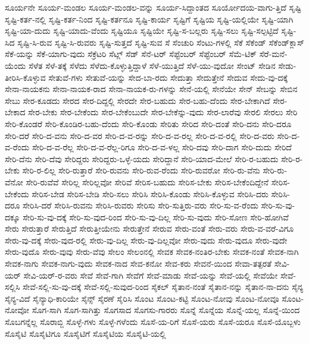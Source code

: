 {ಸೂರ್ಯನೇ
ಸೂರ್ಯ-ಮಂಡಲ
ಸೂರ್ಯ-ಮಂಡಲ-ವನ್ನು
ಸೂರ್ಯ-ಸಿದ್ದಾಂತದ
ಸೂರ್ಯೋದಯ-ವಾಗು-ತ್ತಿದೆ
ಸೃಷ್ಟಿ
ಸೃಷ್ಟಿ-ಕರ್ತ-ನಲ್ಲಿ
ಸೃಷ್ಟಿ-ಕರ್ತ-ನಿಂದ
ಸೃಷ್ಟಿ-ಕರ್ತನೂ
ಸೃಷ್ಟಿ-ಕಾರ್ಯ
ಸೃಷ್ಟಿಗೆ
ಸೃಷ್ಟಿಯ
ಸೃಷ್ಟಿ-ಯಲ್ಲಿಯೇ
ಸೃಷ್ಟಿ-ಯಾಗಿ
ಸೃಷ್ಟಿ-ಯಾ-ದುದು
ಸೃಷ್ಟಿ-ಯಾದು-ವೆಂದು
ಸೃಷ್ಟಿಯೂ
ಸೃಷ್ಟಿಯೇ
ಸೃಷ್ಟಿ-ಸ-ಬಲ್ಲರು
ಸೃಷ್ಟಿ-ಸಲು
ಸೃಷ್ಟಿ-ಸಲ್ಪಟ್ಟಿದೆ
ಸೃಷ್ಟಿ-ಸಿದ
ಸೃಷ್ಟಿ-ಸಿ-ರುವ
ಸೃಷ್ಟಿ-ಸಿ-ರುವರು
ಸೃಷ್ಟಿ-ಸುತ್ತದೆ
ಸೃಷ್ಟಿ-ಸುವ
ಸೆ
ಸೆಂಚುರಿ
ಸೆಂಟು-ಗಳಲ್ಲಿ
ಸೆಕೆ
ಸೆಕೆಂಡ್
ಸೆಕೆಂಡ್‌ಕ್ಲಾಸ್
ಸೆಕೆ-ಯನ್ನು
ಸೆಕೆ-ಯಾಗು-ವುದು
ಸೆಕ್ರೆಟರಿ
ಸೆಟ್ಲ್
ಸೆಡ್
ಸೆನೆ-ಟರ್
ಸೆಪ್ಟೆಂಬರ್
ಸೆಪ್ಟೆಂಬರ್‌
ಸೆಮೆ-ಟಿಕ್
ಸೆರೆ-ಮನೆ-ಯೆಂದು
ಸೆಳೆತ
ಸೆಳೆ-ತಕ್ಕೆ
ಸೆಳೆದು
ಸೆಳೆದು-ಕೊಳ್ಳುತ್ತಿದ್ದಾಳೆ
ಸೆಳೆ-ಯುತ್ತಿದೆ
ಸೆಳೆ-ಯು-ವುದೋ
ಸೇಂಟ್
ಸೇಡಿನ
ಸೇಡು-ತೀರಿಸಿ-ಕೊಳ್ಳುವ
ಸೇತುವೆ-ಗಳು
ಸೇತುವೆ-ಯನ್ನು
ಸೇದ-ಬಾ-ರದು
ಸೇದುತ್ತಾ
ಸೇದುತ್ತೇನೆ
ಸೇದುವ
ಸೇದು-ವು-ದಕ್ಕೆ
ಸೇನಾ-ನಾಯಕನು
ಸೇನಾ-ನಾಯಕ-ರಾದ
ಸೇನಾ-ನಾಯಕ-ರು-ಗಳನ್ನು
ಸೇನೆ-ಯಲ್ಲಿ
ಸೇನೆಯೇ
ಸೇನ್
ಸೇಬನ್ನು
ಸೇಬಿನ
ಸೇಬು
ಸೇರ-ಕೂಡದು
ಸೇರದ
ಸೇರ-ದಿದ್ದಲ್ಲಿ
ಸೇರದೇ
ಸೇರ-ಬಹುದು
ಸೇರ-ಬಹು-ದೆಂದು
ಸೇರ-ಬೇಕಾಗಿದೆ
ಸೇರ-ಬೇಕಾದ
ಸೇರ-ಬೇಕು
ಸೇರ-ಬೇಕೆಂದು
ಸೇರ-ಬೇಕೆಂಬುದೇ
ಸೇರ-ಬೇಕೆನ್ನು-ವುದು
ಸೇರ-ಲಾರೆವು
ಸೇರಲಿ
ಸೇರಲು
ಸೇರಿ
ಸೇರಿ-ಕೊಂಡರೆ
ಸೇರಿ-ಕೊಂಡಿರ-ಬಹು-ದೆಂದು
ಸೇರಿ-ಕೊಂಡು
ಸೇರಿತು
ಸೇರಿದ
ಸೇರಿ-ದಂತೆ
ಸೇರಿ-ದನು
ಸೇರಿ-ದರೂ
ಸೇರಿ-ದರೆ
ಸೇರಿ-ದ-ವನು
ಸೇರಿ-ದ-ವರ
ಸೇರಿ-ದ-ವ-ರನ್ನು
ಸೇರಿ-ದ-ವ-ರಲ್ಲ
ಸೇರಿ-ದ-ವ-ರಲ್ಲಿ
ಸೇರಿ-ದ-ವರು
ಸೇರಿ-ದ-ವ-ರೆಂದು
ಸೇರಿ-ದ-ವ-ರೆಲ್ಲ
ಸೇರಿ-ದ-ವ-ರೆಲ್ಲ-ರಿಗೂ
ಸೇರಿ-ದ-ವ-ಳಲ್ಲ
ಸೇರಿ-ದವು
ಸೇರಿ-ದಾಗ
ಸೇರಿ-ದುದು
ಸೇರಿದೆ
ಸೇರಿ-ದೆನು
ಸೇರಿ-ದೆವು
ಸೇರಿದ್ದರು
ಸೇರಿದ್ದರು-ಒಳ್ಳೆ-ಯದು
ಸೇರಿದ್ದಾನೆ
ಸೇರಿ-ಯಾದ-ಮೇಲೆ
ಸೇರಿ-ರ-ಬಹುದು
ಸೇರಿ-ರ-ಬೇಕು
ಸೇರಿ-ರ-ಲಿಲ್ಲ
ಸೇರಿ-ರುತ್ತಾರೆ
ಸೇರಿ-ರುವನು
ಸೇರಿ-ರುವ-ರೆಂದು
ಸೇರಿ-ರುವರೋ
ಸೇರಿ-ರು-ವೆನು
ಸೇರಿ-ರು-ವೆನೋ
ಸೇರಿ-ರುವೆವೆ
ಸೇರಿಲ್ಲ
ಸೇರಿಲ್ಲವೋ
ಸೇರಿವೆ
ಸೇರಿಸ-ಬಹುದು
ಸೇರಿಸ-ಬೇಕು
ಸೇರಿಸ-ಬೇಕೆಂದಿದ್ದೇನೆ
ಸೇರಿಸ-ಬೇಕೆಂದು
ಸೇರಿಸ-ಬೇಡ
ಸೇರಿಸ-ಬೇಡಿ
ಸೇರಿ-ಸಲು
ಸೇರಿಸಿ
ಸೇರಿಸಿ-ಕೊಂಡು
ಸೇರಿಸಿ-ಕೊಳ್ಳುವ
ಸೇರಿಸಿ-ದರು
ಸೇರಿಸಿ-ದರೂ
ಸೇರಿಸಿ-ದರೆ
ಸೇರಿಸಿ-ರುವನು
ಸೇರಿಸಿ-ರುವರು
ಸೇರಿಸು
ಸೇರಿ-ಸುತ್ತಿರು-ವರು
ಸೇರಿ-ಸು-ವ-ರೆಂದು
ಸೇರಿ-ಸು-ವು-ದಕ್ಕೂ
ಸೇರಿ-ಸು-ವು-ದಕ್ಕೆ
ಸೇರಿ-ಸು-ವುದ-ರಿಂದ
ಸೇರಿ-ಸು-ವು-ದಿಲ್ಲ
ಸೇರಿ-ಸು-ವುದು
ಸೇರಿ-ಸೋಣ
ಸೇರಿ-ಹೋಗಿವೆ
ಸೇರು
ಸೇರುತ್ತಾರೆ
ಸೇರುತ್ತಿದೆ
ಸೇರುತ್ತೀಯೇನು
ಸೇರುತ್ತೇನೆ
ಸೇರುವ
ಸೇರು-ವಂತೆ
ಸೇರು-ವರು
ಸೇರು-ವ-ವರೆ-ವಿಗೂ
ಸೇರು-ವು-ದಕ್ಕೆ
ಸೇರು-ವುದ-ರಲ್ಲಿ
ಸೇರು-ವು-ದಿಲ್ಲ
ಸೇರು-ವು-ದಿಲ್ಲವೋ
ಸೇರು-ವುದು
ಸೇರು-ವುದೂ
ಸೇರು-ವುದೇ
ಸೇರು-ವುದೊ
ಸೇರು-ವುವು
ಸೇರು-ವೆವು
ಸೇಲಂ
ಸೇಲಂನಲ್ಲಿ
ಸೇವಕ
ಸೇವಕ-ನಂತಿರ-ಬೇಕು
ಸೇವಕ-ನಂತೆ
ಸೇವಕ-ನಾಗಿ
ಸೇವಕ-ನಾಗು
ಸೇವಕ-ನಾಗು-ವುದು
ಸೇವಕ-ನಾದ
ಸೇವ-ಕನೋ
ಸೇವ-ಕರು
ಸೇವನೆ-ಯಿಂದ
ಸೇವಾ-ತತ್ಪರತೆ
ಸೇವಿ-ಯರ್
ಸೇವಿ-ಯರ್‌-ರ-ವರು
ಸೇವೆ
ಸೇವೆ-ಗಾಗಿ
ಸೇವೆಗೆ
ಸೇವೆ-ಮಾಡು
ಸೇವೆ-ಯನ್ನು
ಸೇವೆ-ಯಲ್ಲಿ
ಸೇವೆಯೇ
ಸೇವೆ-ಸಲ್ಲಿಸಿ
ಸೇವೆ-ಸಲ್ಲಿ-ಸು-ವು-ದಕ್ಕೆ
ಸೇವೆ-ಸಲ್ಲಿ-ಸುವುದ-ರಿಂದ
ಸೈಕಲ್
ಸೈತಾನ-ನಂತೆ
ಸೈತಾನ-ನನ್ನು
ಸೈತಾನ-ನಾ-ದನು
ಸೈನ್ಯ
ಸೈನ್ಯ-ವಿದೆ
ಸೈನ್ಯಾಧಿ-ಕಾರಿಯೇ
ಸೈನ್ಸ್
ಸೈರಣೆ
ಸೈರಿಸಿ
ಸೊಂಟ
ಸೊಂಟ-ಕಟ್ಟಿ
ಸೊಂಟ-ನೋವು
ಸೊಂಟ-ನೋವೂ
ಸೊಂಟ-ನೋವೋ
ಸೊಗ-ಸಾಗಿ
ಸೊಗ-ಸಾಗಿತ್ತು
ಸೊಗಸಾದ
ಸೊಗಸು-ಗಾರರು
ಸೊನ್ನೆ
ಸೊನ್ನೆಯ
ಸೊನ್ನೆ-ಯಲ್ಲ
ಸೊನ್ನೆ-ಯಿಂದ
ಸೊಬಗನ್ನೆಲ್ಲ
ಸೊರಾಬ್ಜಿ
ಸೊಳ್ಳೆ-ಗಳು
ಸೊಳ್ಳೆ-ಗಳೆಂದು
ಸೊಸೆ-ಯ-ರಿಗೆ
ಸೊಸೆ-ಯರು
ಸೊಸೆ-ಯರೂ
ಸೊಸೆ-ಯೊಬ್ಬಳು
ಸೊಸೈಟಿ
ಸೊಸೈಟಿಗೂ
ಸೊಸೈಟಿಗೆ
ಸೊಸೈಟಿಯ
ಸೊಸೈಟಿ-ಯಲ್ಲಿ
}
